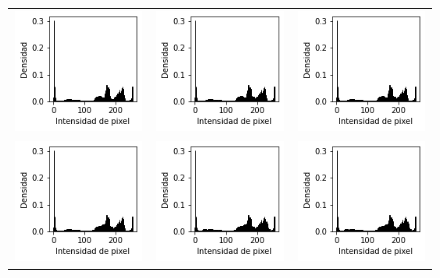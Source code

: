 \begin{figure}[!b]
\begin{tabular}{ccc}
        \includegraphics[width=4cm]{../Plots/THR/threshold_input_6.png} &
        \includegraphics[width=4cm]{../Plots/THR/threshold_input_7.png} &
        \includegraphics[width=4cm]{../Plots/THR/threshold_input_8.png} \\

        \includegraphics[width=4cm]{../Plots/THR/threshold_input_9.png} &
        \includegraphics[width=4cm]{../Plots/THR/threshold_input_10.png} &
        \includegraphics[width=4cm]{../Plots/THR/threshold_input_11.png} \\


\end{tabular}
\end{figure}
